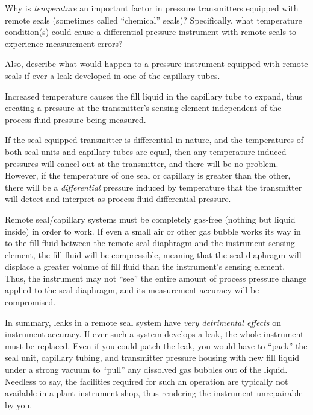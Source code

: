

Why is {\it temperature} an important factor in pressure transmitters equipped with remote seals (sometimes called ``chemical'' seals)?  Specifically, what temperature condition(s) could cause a differential pressure instrument with remote seals to experience measurement errors?

\vskip 10pt

Also, describe what would happen to a pressure instrument equipped with remote seals if ever a leak developed in one of the capillary tubes.







Increased temperature causes the fill liquid in the capillary tube to expand, thus creating a pressure at the transmitter's sensing element independent of the process fluid pressure being measured.

If the seal-equipped transmitter is differential in nature, and the temperatures of both seal units and capillary tubes are equal, then any temperature-induced pressures will cancel out at the transmitter, and there will be no problem.  However, if the temperature of one seal or capillary is greater than the other, there will be a {\it differential} pressure induced by temperature that the transmitter will detect and interpret as process fluid differential pressure.

\vskip 10pt

Remote seal/capillary systems must be completely gas-free (nothing but liquid inside) in order to work.  If even a small air or other gas bubble works its way in to the fill fluid between the remote seal diaphragm and the instrument sensing element, the fill fluid will be compressible, meaning that the seal diaphragm will displace a greater volume of fill fluid than the instrument's sensing element.  Thus, the instrument may not ``see'' the entire amount of process pressure change applied to the seal diaphragm, and its measurement accuracy will be compromised.

In summary, leaks in a remote seal system have {\it very detrimental effects} on instrument accuracy.  If ever such a system develops a leak, the whole instrument must be replaced.  Even if you could patch the leak, you would have to ``pack'' the seal unit, capillary tubing, and transmitter pressure housing with new fill liquid under a strong vacuum to ``pull'' any dissolved gas bubbles out of the liquid.  Needless to say, the facilities required for such an operation are typically not available in a plant instrument shop, thus rendering the instrument unrepairable by you.











